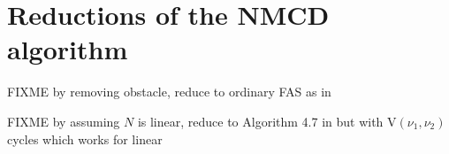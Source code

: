\documentclass[letterpaper,final,12pt,reqno]{amsart}
\theoremstyle{cstyle}
\theoremstyle{cstyle*}
\theoremstyle{dstyle}
\numberwithin{equation}{section}
\numberwithin{figure}{section}
\numberwithin{table}{section}
\numberwithin{theorem}{section}
\begin{document}





\appendix
\section{Reductions of the NMCD algorithm}

FIXME by removing obstacle, reduce to ordinary FAS as in \cite{Bruneetal2015}

FIXME by assuming $N$ is linear, reduce to Algorithm 4.7 in \cite{GraeserKornhuber2009} but with $\text{V}(\nu_1,\nu_2)$ cycles which works for linear
\end{document}
